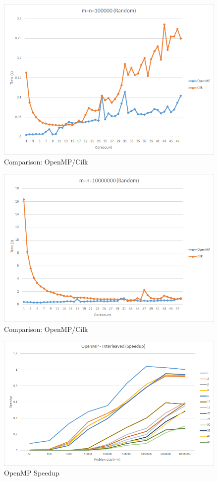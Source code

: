 \documentclass[12pt,a4paper,titlepage,oneside]{scrartcl}
\begin{document}
\begin{figure}[h]
\includegraphics[width=\linewidth]{Saturn_Random_100000}
\caption{Comparison: OpenMP/Cilk}
\end{figure}

\begin{figure}[h]
\includegraphics[width=\linewidth]{Saturn_Random_10000000}
\caption{Comparison: OpenMP/Cilk}
\end{figure}

\begin{figure}[h]
\includegraphics[width=\linewidth]{Saturn_OpenMP_Speedup}
\caption{OpenMP Speedup}
\end{figure}
\end{document}
